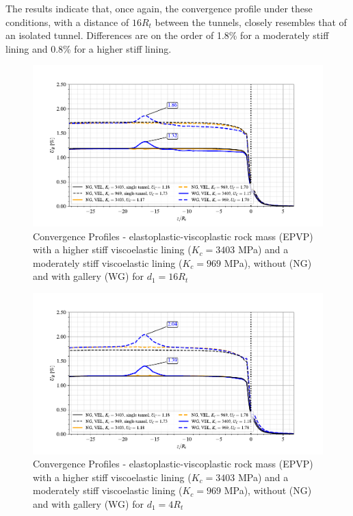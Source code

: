 \documentclass[a4paper,fleqn]{cas-sc}
\begin{document}
The results indicate that, once again, the convergence profile under these conditions, with a distance of $16R_t$ between the tunnels, closely resembles that of an isolated tunnel. Differences are on the order of 1.8\% for a moderately stiff lining and 0.8\% for a higher stiff lining.
\begin{figure}[h!]
	\centering
	\includegraphics[scale=0.9]{Convergence Profiles - EPVP_VEL_d1_16Ri_anotate.pdf}
	\caption{Convergence Profiles - elastoplastic-viscoplastic rock mass (EPVP) with a higher stiff viscoelastic lining ($K_c = 3403$ MPa) and a moderately stiff viscoelastic lining ($K_c = 969$ MPa), without (NG) and with gallery (WG) for $d_1 = 16R_t$}
	\label{EPVP_VEL_d1_16Ri}
\end{figure}
\FloatBarrier
\begin{figure}[h!]
	\centering
	\includegraphics[scale=0.9]{Convergence Profiles - EPVP_VEL_d1_4Ri_anotate.pdf}
	\caption{Convergence Profiles - elastoplastic-viscoplastic rock mass (EPVP) with a higher stiff viscoelastic lining ($K_c = 3403$ MPa) and a moderately stiff viscoelastic lining ($K_c = 969$ MPa), without (NG) and with gallery (WG) for $d_1 = 4R_t$}
	\label{EPVP_VEL_d1_4Ri}
\end{figure}
\FloatBarrier
\end{document}
